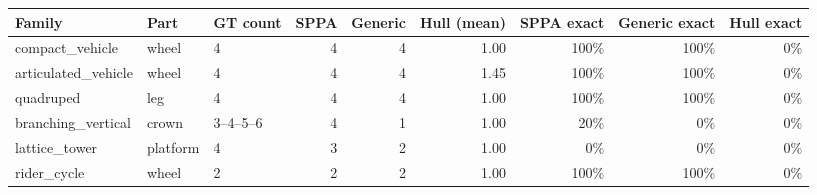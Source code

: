 \begin{tabular}{@{}lllrrrrrr@{}}
\toprule
Family & Part & GT count & SPPA & Generic & Hull (mean) & SPPA exact & Generic exact & Hull exact \\
\midrule
compact\_vehicle & wheel & 4 & 4 & 4 & 1.00 & 100\% & 100\% & 0\% \\
articulated\_vehicle & wheel & 4 & 4 & 4 & 1.45 & 100\% & 100\% & 0\% \\
quadruped & leg & 4 & 4 & 4 & 1.00 & 100\% & 100\% & 0\% \\
branching\_vertical & crown & 3--4--5--6 & 4 & 1 & 1.00 & 20\% & 0\% & 0\% \\
lattice\_tower & platform & 4 & 3 & 2 & 1.00 & 0\% & 0\% & 0\% \\
rider\_cycle & wheel & 2 & 2 & 2 & 1.00 & 100\% & 100\% & 0\% \\
\bottomrule
\end{tabular}

